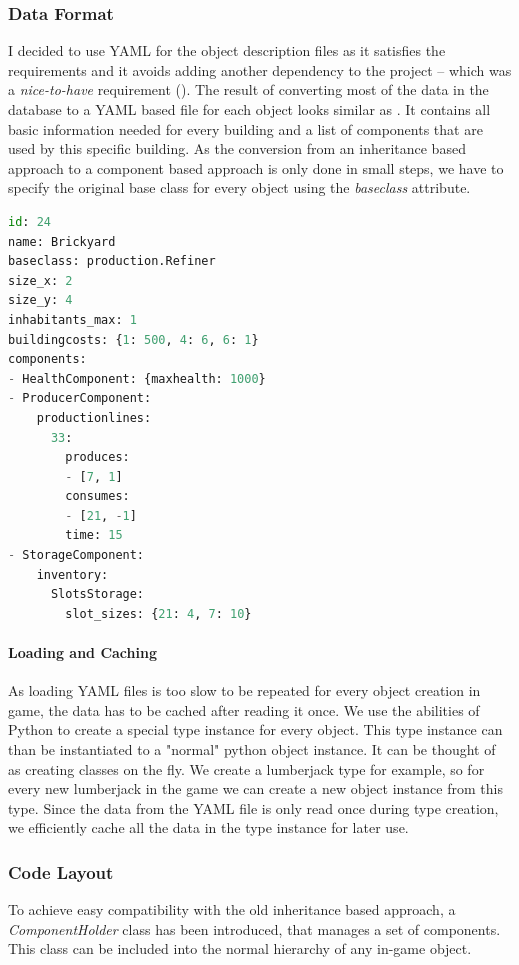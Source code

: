 \subsubsection{Data Format}
I decided to use YAML for the object description files as it satisfies the requirements and it avoids adding another
dependency to the project -- which was a \textit{nice-to-have} requirement (). The result of converting most of the data in the database to a YAML based file for each
object looks similar as . It contains all basic information needed for every building and a list of components
that are used by this specific building. As the conversion from an inheritance based approach to a component based
approach is only done in small steps, we have to specify the original base class for every object using the
\textit{baseclass} attribute.

\begin{lstlisting}[language=python,caption=A basic (shortened) building definition in YAML for \UH{}, label=uhyaml]
id: 24
name: Brickyard
baseclass: production.Refiner
size_x: 2
size_y: 4
inhabitants_max: 1
buildingcosts: {1: 500, 4: 6, 6: 1}
components:
- HealthComponent: {maxhealth: 1000}
- ProducerComponent:
    productionlines:
      33:
        produces:
        - [7, 1]
        consumes:
        - [21, -1]
        time: 15
- StorageComponent:
    inventory:
      SlotsStorage:
        slot_sizes: {21: 4, 7: 10}
\end{lstlisting}

\paragraph{Loading and Caching}
As loading YAML files is too slow to be repeated for every object creation in game, the data has to be cached after
reading it once. We use the abilities of Python to create a special type instance for every object. This type instance can
than be instantiated to a "normal" python object instance. It can be thought of as creating classes on the fly. We
create a lumberjack type for example, so for every new lumberjack in the game we can create a new object instance from
this type.
Since the data from the YAML file is only read once during type creation, we efficiently cache all the data in the
type instance for later use.

\subsubsection{Code Layout}
To achieve easy compatibility with the old inheritance based approach, a \textit{ComponentHolder} class has been
introduced, that manages a set of components. This class can be included into the normal hierarchy of any in-game object.

